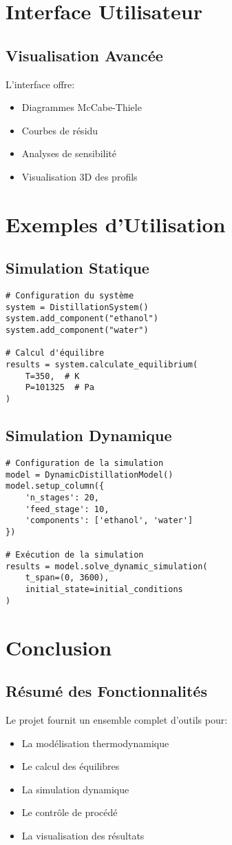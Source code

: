 \documentclass[12pt,a4paper]{report}
\begin{document}
\chapter{Interface Utilisateur}
\section{Visualisation Avancée}
L'interface offre:
\begin{itemize}
    \item Diagrammes McCabe-Thiele
    \item Courbes de résidu
    \item Analyses de sensibilité
    \item Visualisation 3D des profils
\end{itemize}

\chapter{Exemples d'Utilisation}
\section{Simulation Statique}
\begin{lstlisting}
# Configuration du système
system = DistillationSystem()
system.add_component("ethanol")
system.add_component("water")

# Calcul d'équilibre
results = system.calculate_equilibrium(
    T=350,  # K
    P=101325  # Pa
)
\end{lstlisting}

\section{Simulation Dynamique}
\begin{lstlisting}
# Configuration de la simulation
model = DynamicDistillationModel()
model.setup_column({
    'n_stages': 20,
    'feed_stage': 10,
    'components': ['ethanol', 'water']
})

# Exécution de la simulation
results = model.solve_dynamic_simulation(
    t_span=(0, 3600),
    initial_state=initial_conditions
)
\end{lstlisting}

\chapter{Conclusion}
\section{Résumé des Fonctionnalités}
Le projet fournit un ensemble complet d'outils pour:
\begin{itemize}
    \item La modélisation thermodynamique
    \item Le calcul des équilibres
    \item La simulation dynamique
    \item Le contrôle de procédé
    \item La visualisation des résultats
\end{itemize}
\end{document}

